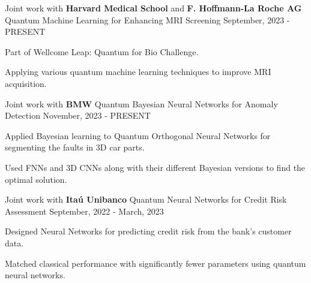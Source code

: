 

\begin{cventries}

  \cventry
    {Joint work with \textbf{Harvard Medical School} and \textbf{F. Hoffmann-La Roche AG}} %
    {Quantum Machine Learning for Enhancing MRI Screening} %
    {} %
    {September, 2023 - PRESENT} %
    {
      \begin{cvitems} %
        \item {Part of Wellcome Leap: Quantum for Bio Challenge.}
        \item {Applying various quantum machine learning techniques to improve MRI acquisition.}
      \end{cvitems}
    }

  \cventry
    {Joint work with \textbf{BMW}} %
    {Quantum Bayesian Neural Networks for Anomaly Detection} %
    {} %
    {November, 2023 - PRESENT} %
    {
      \begin{cvitems} %
        \item {Applied Bayesian learning to Quantum Orthogonal Neural Networks for segmenting the faults in 3D car parts.}
        \item {Used FNNs and 3D CNNs along with their different Bayesian versions to find the optimal solution.}
      \end{cvitems}
    }

  \cventry
    {Joint work with \textbf{Itaú Unibanco}} %
    {Quantum Neural Networks for Credit Risk Assessment} %
    {} %
    {September, 2022 - March, 2023} %
    {
      \begin{cvitems} %
        \item {Designed Neural Networks for predicting credit risk from the bank's customer data.}
        \item {Matched classical performance with significantly fewer parameters using quantum neural networks.}
      \end{cvitems}
    }


\end{cventries}
